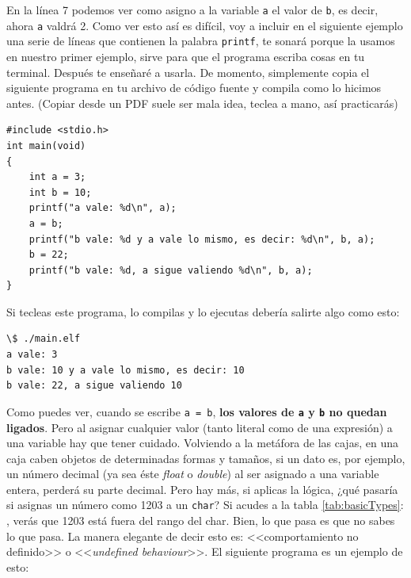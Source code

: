 \documentclass[a4paper]{article}
\begin{document}
En la línea 7 podemos ver como asigno a la variable \verb!a! el valor de
\verb!b!, es decir, ahora \verb!a! valdrá 2. Como ver esto así es difícil, voy a
incluir en el siguiente
ejemplo una serie de líneas que contienen la palabra \verb!printf!, te sonará
porque la usamos en nuestro primer ejemplo, sirve para que el programa escriba
cosas en tu terminal. Después te enseñaré a usarla.
De momento, simplemente copia el
siguiente programa en tu archivo de código fuente y compila como lo hicimos
antes. (Copiar desde un PDF suele ser mala idea, teclea a mano, así practicarás)

\noindent
\begin{minipage}[H]{\linewidth}
\mbox{}
\begin{lstlisting}[style=C, caption={Ejemplo final de variables},
label={lst:variableFinalExample}]
#include <stdio.h>
int main(void)
{
    int a = 3;
    int b = 10;
    printf("a vale: %d\n", a);
    a = b;
    printf("b vale: %d y a vale lo mismo, es decir: %d\n", b, a);
    b = 22;
    printf("b vale: %d, a sigue valiendo %d\n", b, a);
}
\end{lstlisting}
\end{minipage}


Si tecleas este programa, lo compilas y lo ejecutas
debería salirte algo como esto:


\noindent
\begin{minipage}[H]{\linewidth}
\mbox{}
\begin{lstlisting}[style=terminalStyle]
\$ ./main.elf
a vale: 3
b vale: 10 y a vale lo mismo, es decir: 10
b vale: 22, a sigue valiendo 10
\end{lstlisting}
\end{minipage}

Como puedes ver, cuando se escribe \verb!a = b!,
\textbf{los valores de \texttt{a} y \texttt{b} no quedan ligados}. Pero al
asignar cualquier valor (tanto literal como de una expresión) a una variable
hay que tener cuidado. Volviendo a la metáfora de las cajas, en una caja caben
objetos de determinadas formas y tamaños, si un dato es,
por ejemplo, un número decimal (ya sea éste \textit{float} o \textit{double})
al ser asignado a una variable entera, perderá su parte decimal. Pero hay más,
si aplicas la lógica, ¿qué pasaría si asignas un número como 1203 a un
\texttt{char}? Si acudes a la tabla \ref{tab:basicTypes}:
, verás que 1203 está fuera del rango del
char. Bien, lo que pasa es que no sabes lo que pasa. La manera elegante de decir
esto es: <<comportamiento no definido>> o <<\textit{undefined behaviour}>>.
El siguiente programa es un ejemplo de esto:
\end{document}
